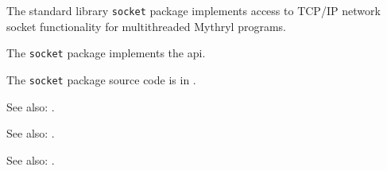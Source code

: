 
The standard library {\tt socket} package implements access to {\sc TCP/IP} network socket functionality for multithreaded Mythryl programs.

The {\tt socket} package implements the  api.

The {\tt socket} package source code is in .

See also:  .

See also:  .

See also:  .
